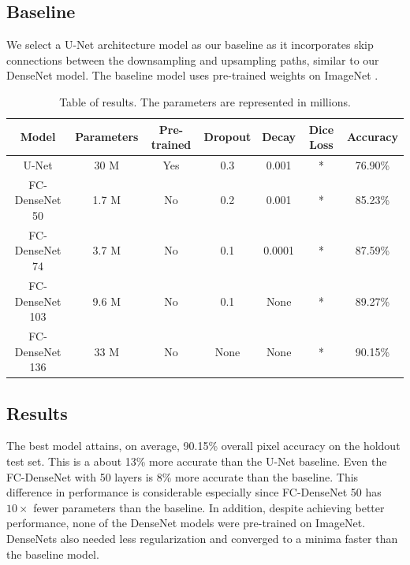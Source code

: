 \documentclass{llncs}
\begin{document}
\subsection{Baseline}
We select a U-Net \cite{U-Net} architecture model as our baseline as it incorporates skip connections between the downsampling and upsampling paths, similar to our DenseNet model. The baseline model uses pre-trained weights on ImageNet \cite{Imagenet}.   

\setlength{\tabcolsep}{3pt}
\begin{table}
	\centering
	\begin{tabular}{c | c | c | c | c | c | c}
		\hline
		Model & Parameters & Pre-trained & Dropout & Decay & Dice Loss & Accuracy \\ 
		\hline
		U-Net & 30 M & Yes & 0.3 & 0.001 & * & 76.90\% \\ 
		FC-DenseNet 50 & 1.7 M & No & 0.2 & 0.001 & * & 85.23\% \\ 
		FC-DenseNet 74 & 3.7 M & No & 0.1 & 0.0001 & * & 87.59\% \\ 
		FC-DenseNet 103 & 9.6 M & No & 0.1 & None & * & 89.27\% \\
		FC-DenseNet 136 & 33 M & No & None & None & * & 90.15\% \\
	\end{tabular}
	\bigskip
	\caption{Table of results. The parameters are represented in millions.}
\end{table}
\vspace{-4em}

\subsection{Results}
The best model attains, on average, 90.15\% overall pixel accuracy on the holdout test set. This is a about 13\% more accurate than the U-Net baseline. Even the FC-DenseNet with 50 layers is 8\% more accurate than the baseline. This difference in performance is considerable especially since FC-DenseNet 50 has $10 \times$ fewer parameters than the baseline. In addition, despite achieving better performance, none of the DenseNet models were pre-trained on ImageNet. DenseNets also needed less regularization and converged to a minima faster than the baseline model.
\end{document}
